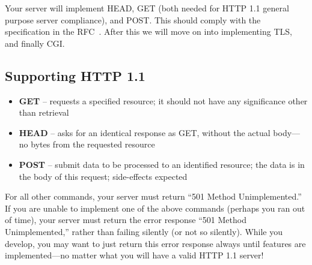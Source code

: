 \label{sec:liso}
Your server will implement HEAD, GET (both needed for HTTP 1.1 general purpose
server compliance), and POST.  This should comply with the
specification in the RFC~\cite{httprfc}.  After this we will move on into
implementing TLS, and finally CGI.


\vspace{0.25in}

\subsection{Supporting HTTP 1.1}

\begin{itemize}
\item \textbf{GET} -- requests a specified resource; it should not have any
                       significance other than retrieval
\item \textbf{HEAD} -- asks for an identical response as GET, without the actual
                       body---no bytes from the requested resource
\item \textbf{POST} -- submit data to be processed to an identified resource;
                       the data is in the body of this request; side-effects
                       expected
\end{itemize}

For all other commands, your server must return ``501 Method Unimplemented.'' If
you are unable to implement one of the above commands (perhaps you ran out of
time), your server must return the error response ``501 Method Unimplemented,''
rather than failing silently (or not so silently).  While you develop, you
may want to just return this error response always until features are
implemented---no matter what you will have a valid HTTP 1.1 server!

